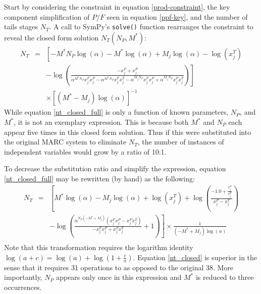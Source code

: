 \documentclass[preprint,12pt]{elsarticle}
\begin{document}
Start by considering the constraint in equation \ref{prod-constraint}, the key 
component simplification of $P/F$ seen in equation \ref{ppf-key}, and the number
of tails stages $N_T$.  A call to SymPy's \texttt{solve()} function rearranges the 
constraint to reveal the closed form solution $N_T(N_P, M^*)$:
\begin{equation}
\begin{array}{lcl}
N_T & = & \left[- M^{*} N_{P} \log{\left (\alpha \right )} - M^{*} \log{\left (\alpha \right )} + M_{j} \log{\left (\alpha \right )} - \log{\left (x^{T}_{j} \right )} \right. \\ 
& & \left. - \log{\left (\frac{- x^{F}_{j} + x^{P}_{j}}{\alpha^{M^{*} N_{P}} x^{F}_{j} x^{P}_{j} - \alpha^{M^{*} N_{P}}x^{F}_{j} x^{T}_{j} - \alpha^{M_{j} N_{P}} x^{F}_{j} x^{P}_{j} + \alpha^{M_{j} N_{P}} x^{P}_{j} x^{T}_{j}} \right )} \right] \\
& & \times \left[\left(M^{*} - M_{j}\right) \log{\left (\alpha \right )} \right]^{-1}
\end{array}
\label{nt_closed_full}
\end{equation}
While equation \ref{nt_closed_full} is only a function of known 
parameters, $N_P$, and $M^*$, it is not an exemplary expression.  This is because both 
$M^*$ and $N_P$ each appear five times in this closed form solution.  Thus if this 
were substituted into the original MARC system to eliminate $N_T$, the number of 
instances of independent variables would grow by a ratio of 10:1.    

To decrease the substitution ratio and simplify the expression, equation 
\ref{nt_closed_full} may be rewritten (by hand) as the following:
\begin{equation}
\begin{array}{lcl}
N_T & = & \left[M^{*} \log{\left (\alpha \right )} - M_{j} \log{\left (\alpha \right )} + \log{\left (x^{T}_{j} \right )} + \log{\left (\frac{-1.0 + \frac{x^{P}_{j}}{x^{F}_{j}}}{x^{P}_{j} - x^{T}_{j}} \right )}  \right. \\
& & \left. - \log{\left (\frac{\alpha^{N_{P} \left(- M^{*} + M_{j}\right)} \left(x^{F}_{j} x^{P}_{j} - x^{P}_{j} x^{T}_{j}\right)}{- x^{F}_{j} x^{P}_{j} + x^{F}_{j} x^{T}_{j}} + 1 \right )}\right] \times \frac{1}{\left(- M^{*} + M_{j}\right) \log{\left (\alpha \right )}} \\
\end{array}
\label{nt_closed}
\end{equation}
Note that this transformation requires the logarithm identity 
$\log(a+c) = \log(a) + \log(1 + \frac{c}{a})$.  Equation \ref{nt_closed} is superior
in the sense that it requires 31 operations to as opposed to the original 38.
More importantly, $N_P$ appears only once in this 
expression and $M^*$ is reduced to three occurrences.
\end{document}
